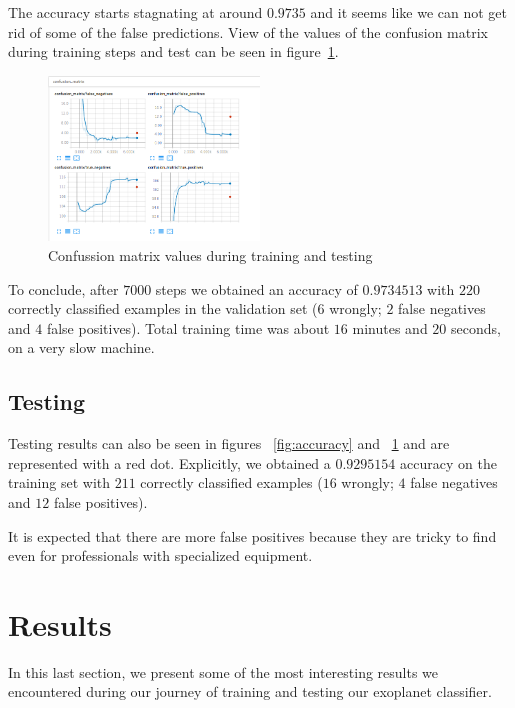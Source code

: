 \documentclass[twoside]{article}
\begin{document}
\begin{multicols}{2}
The accuracy starts stagnating at around $0.9735$ and it seems like we can not get rid of some of the false predictions. View of the values of the confusion matrix during training steps and test can be seen in figure~\ref{fig:confmat}.
\begin{figure}[H]
\includegraphics[width=0.5\textwidth]{train-test_cm}
\caption{Confussion matrix values during training and testing}
\label{fig:confmat}
\end{figure}

To conclude, after $7000$ steps we obtained an accuracy of $0.9734513$ with $220$ correctly classified examples in the validation set ($6$ wrongly; $2$ false negatives and $4$ false positives). Total training time was about $16$ minutes and $20$ seconds, on a very slow machine.

\subsection{Testing}
Testing results can also be seen in figures ~\ref{fig:accuracy} and ~\ref{fig:confmat} and are represented with a red dot. Explicitly, we obtained a $0.9295154$ accuracy on the training set with $211$ correctly classified examples ($16$ wrongly; $4$ false negatives and $12$ false positives).

It is expected that there are more false positives because they are tricky to find even for professionals with specialized equipment.


\section{Results}
In this last section, we present some of the most interesting results we encountered during our journey of training and testing our exoplanet classifier.\\


\end{multicols}
\end{document}
